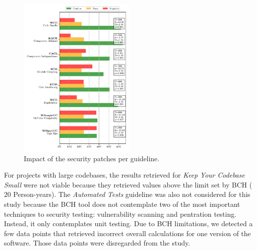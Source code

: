 \documentclass[10pt,conference]{IEEEtran}
\begin{document}
 \begin{figure}[h]
  	\centering
 	\vspace{-0.3 cm}
  	\includegraphics[width=0.5\textwidth]{figures/main_per_guideline.pdf}
 	\vspace{-0.3 cm}
  	\caption{Impact of the security patches per guideline.}
 	\label{fig:guidelines}
 	\vspace{0.2 cm}
 \end{figure}
  
For projects with large codebases, the results retrieved for \emph{Keep Your 
Codebase Small} were not viable because they retrieved values above the limit 
set by BCH ($20$ Person-years). The \emph{Automated Tests} guideline was also 
not considered for this study because the BCH tool does not contemplate two
of the most important techniques to security testing: vulnerability scanning
and pentration testing. Instead, it only contemplates unit 
testing.
Due to BCH limitations, we detected a few data points
that retrieved incorrect overall calculations for one version of the software. 
Those data points were disregarded from the study.
\end{document}
